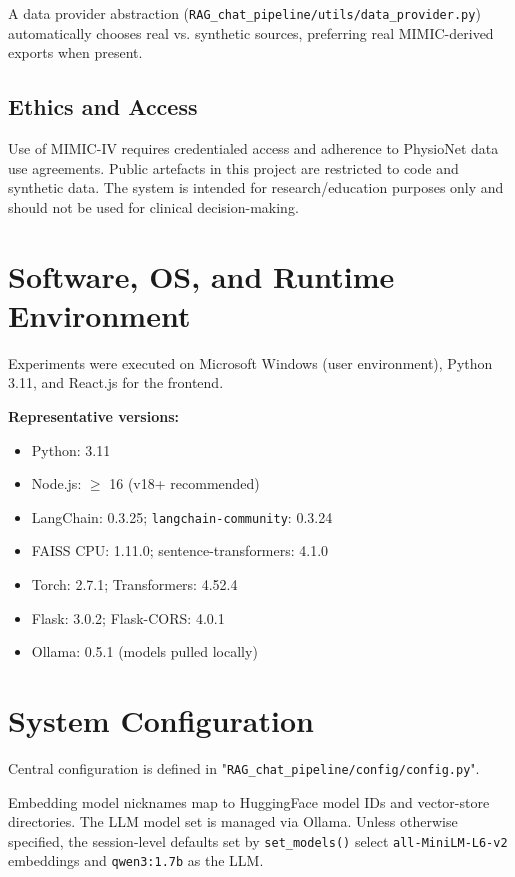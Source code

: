 \noindent A data provider abstraction (\texttt{RAG\_chat\_pipeline/utils/data\_provider.py}) automatically chooses real vs. synthetic sources, preferring real MIMIC-derived exports when present.

\subsection{Ethics and Access}
Use of MIMIC-IV requires credentialed access and adherence to PhysioNet data use agreements. Public artefacts in this project are restricted to code and synthetic data. The system is intended for research/education purposes only and should not be used for clinical decision-making.

\section{Software, OS, and Runtime Environment}
Experiments were executed on Microsoft Windows (user environment), Python 3.11, and React.js for the frontend.

\smallskip
\noindent\textbf{Representative versions:}
\begin{itemize}
  \item Python: 3.11
  \item Node.js: \(\ge\) 16 (v18+ recommended)
  \item LangChain: 0.3.25; \texttt{langchain-community}: 0.3.24
  \item FAISS CPU: 1.11.0; sentence-transformers: 4.1.0
  \item Torch: 2.7.1; Transformers: 4.52.4
  \item Flask: 3.0.2; Flask-CORS: 4.0.1
  \item Ollama: 0.5.1 (models pulled locally)
\end{itemize}

\section{System Configuration}
Central configuration is defined in "\texttt{RAG\_chat\_pipeline/config/config.py}".

\noindent Embedding model nicknames map to HuggingFace model IDs and vector-store directories. The LLM model set is managed via Ollama. Unless otherwise specified, the session-level defaults set by \texttt{set\_models()} select \texttt{all-MiniLM-L6-v2} embeddings and \texttt{qwen3:1.7b} as the LLM. 

